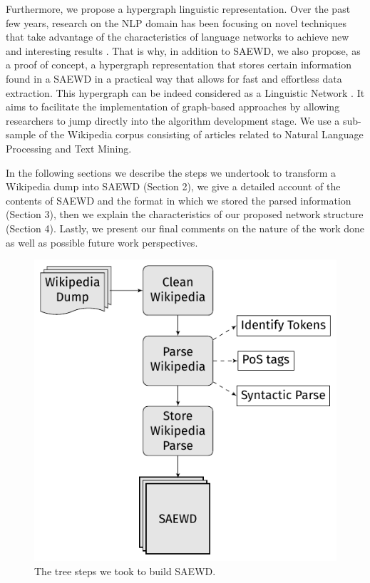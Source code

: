 Furthermore, we propose a hypergraph linguistic representation. Over the past few years, research on the NLP domain has been focusing on novel techniques that take advantage of the characteristics of language networks to achieve new and interesting results \cite{Mihalcea2011}. That is why, in addition to SAEWD, we also propose, as a proof of concept, a hypergraph representation that stores certain information found in a SAEWD in a practical way that allows for fast and effortless data extraction. This hypergraph can be indeed considered as a Linguistic Network \cite{Choudhury09}.  It aims to facilitate the implementation of graph-based approaches by allowing researchers to jump directly into the algorithm development stage. We use a sub-sample of the Wikipedia corpus consisting of articles related to Natural Language Processing and Text Mining. 

In the following sections we describe the steps we undertook to transform a Wikipedia dump into SAEWD (Section 2), we give a detailed account of the contents of SAEWD and the format in which we stored the parsed information (Section 3), then we explain the characteristics of our proposed network structure (Section 4). Lastly, we present our final comments on the nature of the work done as well as possible future work perspectives.




\begin{figure}[t]

	\centering
	\includegraphics[scale=.8]{images/Chapitre7/flow_chart.pdf}
	\caption{The tree steps we took to build SAEWD.}
	\label{fig:flow}
\end{figure}

